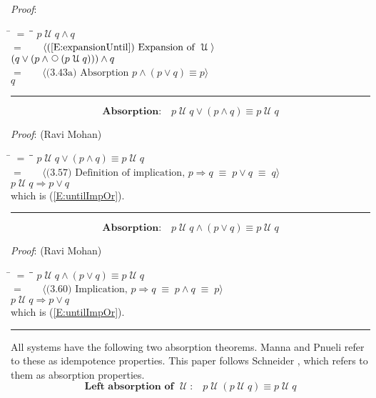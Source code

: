 \documentclass[12pt, fleqn, leqno]{article}
\newcommand{\lgap}{2pt}                             %
\newcommand{\mymathindent}{24pt}                    %
\newcommand{\equivs}{\ensuremath{\;\equiv\;}}       %
\newcommand{\impl}{\ensuremath{\Rightarrow}}        %
\newcommand{\Until}{\;\mathcal{U}\;}
\newcommand{\Next}{\;\,\text{\raisebox{3.5pt}{\circle{6}}}}
\newcommand{\myqed}{\rule[-.23ex]{1.2ex}{2.0ex}}
\newcommand{\myqedtab}{\hspace{384pt}}              %
\newcommand{\Gll} {\langle}                         %
\newcommand{\Ggg} {\rangle}                         %
\newcommand{\Hint}[1]     {\ \ \ $\Gll              \mbox{#1} \Ggg$ }   %
\begin{document}
\emph{Proof}:
\begin{tabbing}
\hspace{\mymathindent} \= $= \;$ \= \myqedtab \= \kill
  \> \>   $p \Until q \land q$\\[\lgap]
  \> $=$  \>  \Hint{(\ref{E:expansionUntil}) Expansion of $\Until$}\\[\lgap]
  \> \>   $(q \lor (p \land \Next(p \Until q))) \land q$\\[\lgap]
  \> $=$  \>  \Hint{(3.43a) Absorption $p \land (p \lor q) \equiv p$}\\[\lgap]
  \> \>   $q$ \quad \myqed
\end{tabbing}
\begin{equation}\label{E:untilOrAnd}
\textbf{Absorption:}\quad p \Until q \lor (p \land q) \equiv p \Until q
\end{equation}

\emph{Proof}: (Ravi Mohan)
\begin{tabbing}
\hspace{\mymathindent} \= $= \;$ \= \myqedtab \= \kill
  \> \>   $p \Until q \lor (p \land q) \equiv p \Until q$\\[\lgap]
\> $=$ \> \Hint{(3.57) Definition of implication, $p\impl q\equivs p\lor q \equivs q$} \\[\lgap]
  \> \>   $p \Until q \impl p \lor q$\\[\lgap]
  \> which is (\ref{E:untilImpOr}). \quad \myqed
\end{tabbing}
\begin{equation}\label{E:untilAndOr}
\textbf{Absorption:}\quad p \Until q \land (p \lor q) \equiv p \Until q
\end{equation}

\emph{Proof}: (Ravi Mohan)
\begin{tabbing}
\hspace{\mymathindent} \= $= \;$ \= \myqedtab \= \kill
  \> \>   $p \Until q \land (p \lor q) \equiv p \Until q$\\[\lgap]
  \> $=$  \>  \Hint{(3.60) Implication, $p\impl q \equivs p\land q \equivs p$}\\[\lgap]
  \> \>   $p \Until q \impl p \lor q$\\[\lgap]
  \> which is (\ref{E:untilImpOr}). \quad \myqed
\end{tabbing}

All systems have the following two absorption theorems.
Manna and Pnueli \cite{Manna} refer to these as idempotence properties.
This paper follows Schneider \cite{Schn}, which refers to them as absorption properties.
\begin{equation}\label{E:untilIdem}
\textbf{Left absorption of $\Until$:}\quad p \Until (p \Until q) \equiv p \Until q
\end{equation}
\end{document}
